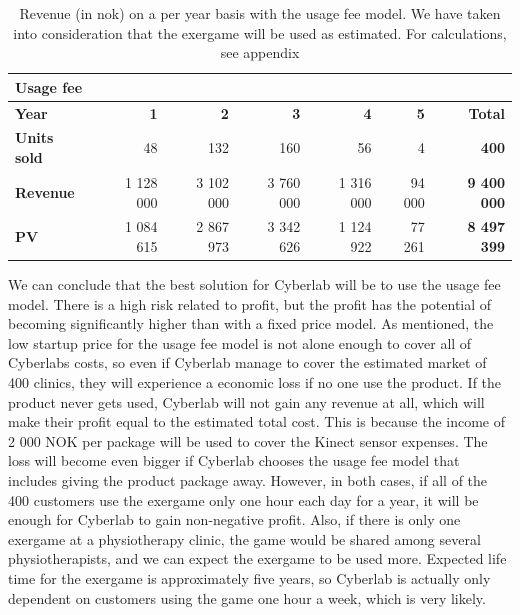 \begin{table}
 \caption[Revenue with use of Usage Fee Model]{Revenue (in \ac{nok}) on a per year basis with the usage fee model. We have taken into consideration that the exergame will be used as estimated. For calculations, see appendix}
    \begin{tabular}{|l|r|r|r|r|r|r|}
        \hline
       \textbf{Usage fee}  & & & & & & \\ \hline
      \textbf{Year} & \textbf{1} & \textbf{2} & \textbf{3} & \textbf{4} & \textbf{5} & \textbf{Total}\\ \hline
	   \textbf{Units sold} & 48 & 132 & 160 & 56 & 4 & \textbf{400}\\ \hline
	   \textbf{Revenue} & 1 128 000 & 3 102 000 & 3 760 000 & 1 316 000 & 94 000 & \textbf{9 400 000} \\ \hline  
	   \textbf{PV} & 1 084 615 & 2 867 973 & 3 342 626 & 1 124 922 & 77 261 & \textbf{8 497 399}  \\ \hline
    \end{tabular}
    \label{tab:revusage}
\end{table}
We can conclude that the best solution for Cyberlab will be to use the usage fee model. There is a high risk related to profit, but the profit has the potential of becoming significantly higher than with a fixed price model. As mentioned, the low startup price for the usage fee model is not alone enough to cover all of Cyberlabs costs, so even if Cyberlab manage to cover the estimated market of 400 clinics, they will experience a economic loss if no one use the product. If the product never gets used, Cyberlab will not gain any revenue at all, which will make their profit equal to the estimated total cost. This is because the income of 2 000 NOK per package will be used to cover the Kinect sensor expenses. The loss will become even bigger if Cyberlab chooses the usage fee model that includes giving the product package away. However, in both cases, if all of the 400 customers use the exergame only one hour each day for a year, it will be enough for Cyberlab to gain non-negative profit. Also, if there is only one exergame at a physiotherapy clinic, the game would be shared among several physiotherapists, and we can expect the exergame to be used more. Expected life time for the exergame is approximately five years, so Cyberlab is actually only dependent on customers using the game one hour a week, which is very likely. \\ \\   
